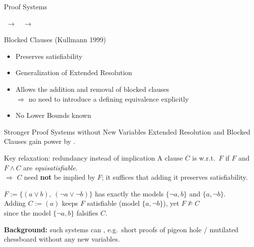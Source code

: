\documentclass[t]{sdqbeamer}
\begin{document}
\begin{frame}{Proof Systems }
\begin{center}\small
{} $\;\rightarrow\;$  $\;\rightarrow\;$ 
\end{center}
\begin{block}{Blocked Clauses (Kullmann 1999)}
\begin{itemize}\setlength{\itemsep}{1ex}
    \item Preserves satisfiability
    \item Generalization of Extended Resolution
    \item Allows the addition and removal of blocked clauses\\[1ex]
    $\Rightarrow$ no need to introduce a defining equivalence explicitly
    \item No Lower Bounds known
\end{itemize}
\end{block}
\end{frame}


\begin{frame}{Stronger Proof Systems without New Variables}
\vspace*{-0.5em}
Extended Resolution and Blocked Clauses gain power by .\\[1ex]
\begin{block}{Key relaxation: redundancy instead of implication}
A clause $C$ is  w.r.t.\ $F$ if $F$ and $F \land C$ are \emph{equisatisfiable}.\\[1ex]
$\Rightarrow$ $C$ need \textbf{not} be implied by $F$; it suffices that adding it preserves satisfiability.
\end{block}
\begin{example}
$F := \bigl\{(a \lor b),\ (\lnot a \lor \lnot b)\bigr\}$ has exactly the models $\{\lnot a, b\}$ and $\{a, \lnot b\}$.\\[1ex]
Adding $C := (a)$ keeps $F$ satisfiable (model $\{a, \lnot b\}$), yet $F \not\models C$\\
since the model $\{\lnot a, b\}$ falsifies $C$.
\end{example}
\textbf{Background:} such systems can , e.g.\ short proofs of pigeon hole / mutilated chessboard without any new variables.
\end{frame}
\end{document}
